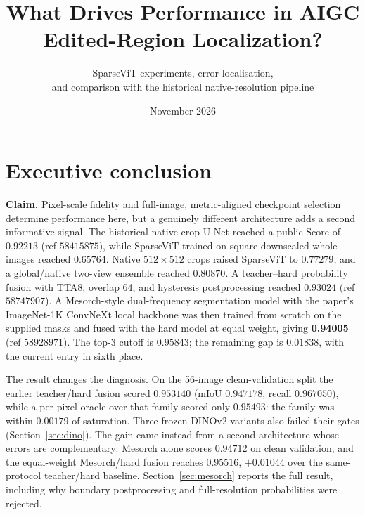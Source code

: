\documentclass[10pt]{article}
\title{What Drives Performance in AIGC Edited-Region Localization?}
\author{SparseViT experiments, error localisation, \\ and comparison with the historical native-resolution pipeline}
\date{November 2026}
\begin{document}
\maketitle
\section{Executive conclusion}
\textbf{Claim.} Pixel-scale fidelity and full-image, metric-aligned checkpoint selection determine performance here, but a genuinely different architecture adds a second informative signal. The historical native-crop U-Net reached a public Score of $0.92213$ (ref $58415875$), while SparseViT trained on square-downscaled whole images reached $0.65764$. Native $512\times512$ crops raised SparseViT to $0.77279$, and a global/native two-view ensemble reached $0.80870$. A teacher--hard probability fusion with TTA8, overlap 64, and hysteresis postprocessing reached $0.93024$ (ref $58747907$). A Mesorch-style dual-frequency segmentation model with the paper's ImageNet-1K ConvNeXt local backbone was then trained from scratch on the supplied masks and fused with the hard model at equal weight, giving \textbf{0.94005} (ref $58928971$). The top-3 cutoff is $0.95843$; the remaining gap is $0.01838$, with the current entry in sixth place.

The result changes the diagnosis. On the 56-image clean-validation split the earlier teacher/hard fusion scored $0.953140$ (mIoU $0.947178$, recall $0.967050$), while a per-pixel oracle over that family scored only $0.95493$: the family was within $0.00179$ of saturation. Three frozen-DINOv2 variants also failed their gates (Section~\ref{sec:dino}). The gain came instead from a second architecture whose errors are complementary: Mesorch alone scores $0.94712$ on clean validation, and the equal-weight Mesorch/hard fusion reaches $0.95516$, $+0.01044$ over the same-protocol teacher/hard baseline. Section~\ref{sec:mesorch} reports the full result, including why boundary postprocessing and full-resolution probabilities were rejected.
\end{document}
